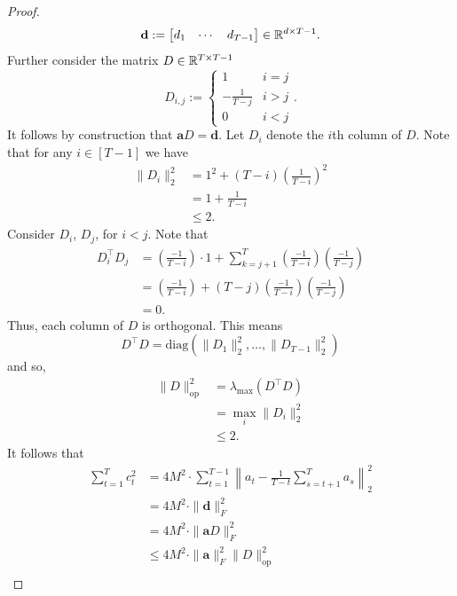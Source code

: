 \begin{proof}
\begin{equation}\mathbf{d} : = \begin{bmatrix}
    d_1 & \cdots & d_{T-1}
\end{bmatrix} \in \mathbb{R}^{d \times  T-1}.\end{equation}Further consider the matrix $D \in \mathbb{R}^{T \times T-1}$ \begin{equation}D_{i,j} := \begin{cases}
    1 & i = j \\
    -\frac{1}{T - j} & i > j \\
    0 &i < j
\end{cases}.\end{equation}
It follows by construction that $\mathbf{a} D = \mathbf{d}$. Let $D_i$ denote the $i$th column of $D$. Note that for any $i \in [T -1]$ we have
\begin{align*}
    \|D_i\|_2^2 &= 1^2 + (T- i)\left(\frac{1}{T-i}\right)^2 \\
    &= 1 + \frac{1}{T-i} \\
    &\leq 2.
\end{align*}
Consider $D_i$, $D_j$, for $i < j$. Note that \begin{align*}
    D_i^\top D_j &= \left( \frac{-1}{T-i}\right) \cdot 1 + \sum_{k =j +1}^{T}\left( \frac{-1}{T-i}\right)\left( \frac{-1}{T-j}\right) \\
    &= \left( \frac{-1}{T-i}\right) + (T-j)\left( \frac{-1}{T-i}\right)\left( \frac{-1}{T-j}\right) \\
    &= 0.
\end{align*}
Thus, each column of $D$ is orthogonal. This means \begin{equation}D^\top D = \text{diag}\left(\|D_1\|_2^2 ,\dots ,\|D_{T-1}\|_2^2\right)\end{equation}
and so,
\begin{align*}
    \|D\|_{\text{op}}^2 &= \lambda_{\max}\left(D^\top D\right) \\
    &= \max_{i} \|D_i\|_2^2 \\
    &\leq 2.
\end{align*}
It follows that
\begin{align*}
    \sum_{t=1}^{T} c_t^2 &=4M^2 \cdot \sum_{t=1}^{T-1}\left\|a_t - \frac{1}{T-t}\sum_{s = t +1}^T a_s\right\|_2^2 \\
    & =4M^2 \cdot \| \mathbf{d}\|_F^2  \\
    &= 4M^2 \cdot\| \mathbf{a}D\|_F^2 \\ 
    &\leq 4M^2 \cdot\| \mathbf{a}\|_F^2\|D\|_{\text{op}}^2 \\

\end{align*}
\end{proof}
